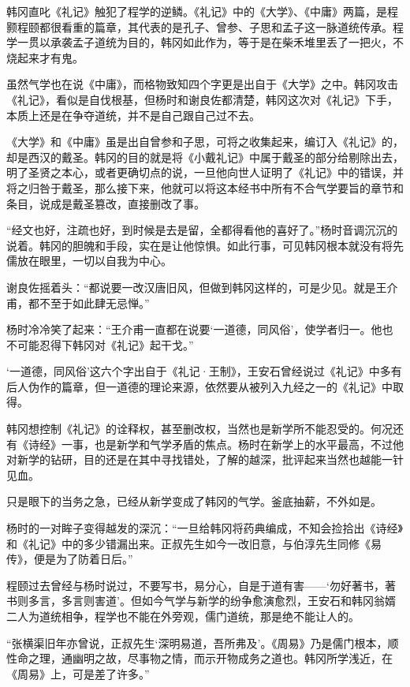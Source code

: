 韩冈直叱《礼记》触犯了程学的逆鳞。《礼记》中的《大学》、《中庸》两篇，是程颢程颐都很看重的篇章，其代表的是孔子、曾参、子思和孟子这一脉道统传承。程学一贯以承袭孟子道统为目的，韩冈如此作为，等于是在柴禾堆里丢了一把火，不烧起来才有鬼。

虽然气学也在说《中庸》，而格物致知四个字更是出自于《大学》之中。韩冈攻击《礼记》，看似是自伐根基，但杨时和谢良佐都清楚，韩冈这次对《礼记》下手，本质上还是在争夺道统，并不是自己跟自己过不去。

《大学》和《中庸》虽是出自曾参和子思，可将之收集起来，编订入《礼记》的，却是西汉的戴圣。韩冈的目的就是将《小戴礼记》中属于戴圣的部分给剔除出去，明了圣贤之本心，或者更确切点的说，一旦他向世人证明了《礼记》中的错误，并将之归咎于戴圣，那么接下来，他就可以将这本经书中所有不合气学要旨的章节和条目，说成是戴圣篡改，直接删改了事。

“经文也好，注疏也好，到时候是去是留，全都得看他的喜好了。”杨时音调沉沉的说着。韩冈的胆魄和手段，实在是让他惊惧。如此行事，可见韩冈根本就没有将先儒放在眼里，一切以自我为中心。

谢良佐摇着头：“都说要一改汉唐旧风，但做到韩冈这样的，可是少见。就是王介甫，都不至于如此肆无忌惮。”

杨时冷冷笑了起来：“王介甫一直都在说要‘一道德，同风俗’，使学者归一。他也不可能忍得下韩冈对《礼记》起干戈。”

‘一道德，同风俗’这六个字出自于《礼记·王制》，王安石曾经说过《礼记》中多有后人伪作的篇章，但一道德的理论来源，依然要从被列入九经之一的《礼记》中取得。

韩冈想控制《礼记》的诠释权，甚至删改权，当然也是新学所不能忍受的。何况还有《诗经》一事，也是新学和气学矛盾的焦点。杨时在新学上的水平最高，不过他对新学的钻研，目的还是在其中寻找错处，了解的越深，批评起来当然也越能一针见血。

只是眼下的当务之急，已经从新学变成了韩冈的气学。釜底抽薪，不外如是。

杨时的一对眸子变得越发的深沉：“一旦给韩冈将药典编成，不知会捡拾出《诗经》和《礼记》中的多少错漏出来。正叔先生如今一改旧意，与伯淳先生同修《易传》，便是为了防着日后。”

程颐过去曾经与杨时说过，不要写书，易分心，自是于道有害——‘勿好著书，著书则多言，多言则害道’。但如今气学与新学的纷争愈演愈烈，王安石和韩冈翁婿二人为道统相争，程学也不能在外旁观，儒门道统，那是绝不能让人的。

“张横渠旧年亦曾说，正叔先生‘深明易道，吾所弗及’。《周易》乃是儒门根本，顺性命之理，通幽明之故，尽事物之情，而示开物成务之道也。韩冈所学浅近，在《周易》上，可是差了许多。”

